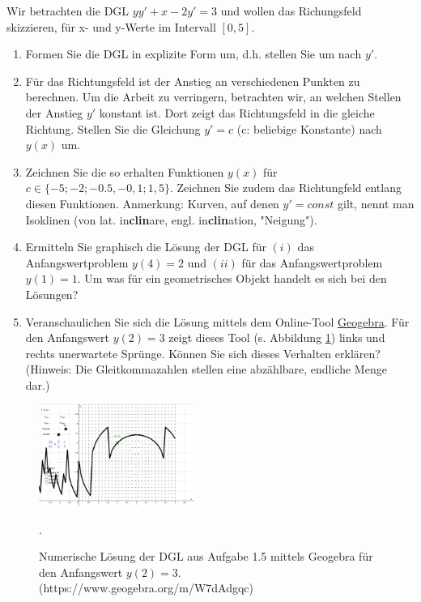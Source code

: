 \item Wir betrachten die DGL $yy'+x-2y'=3$ und wollen das Richungsfeld skizzieren, für x- und y-Werte im Intervall $[0,5]$.
\begin{enumerate}
\item Formen Sie die DGL in explizite Form um, d.h. stellen Sie um nach $y'$.
\item Für das Richtungsfeld ist der Anstieg an verschiedenen Punkten zu berechnen. Um die Arbeit zu verringern, betrachten wir, an welchen Stellen der Anstieg $y'$ konstant ist. Dort zeigt das Richtungsfeld in die gleiche Richtung. Stellen Sie die Gleichung $y'=c$ (c: beliebige Konstante) nach $y(x)$ um.
\item Zeichnen Sie die so erhalten Funktionen $y(x)$ für $c\in\lbrace-5;-2;-0.5,-0,1;1,5\rbrace$. Zeichnen Sie zudem das Richtungfeld entlang diesen Funktionen. Anmerkung: Kurven, auf denen $y'=const$ gilt, nennt man Isoklinen (von lat. in\textbf{clin}are, engl. in\textbf{clin}ation, "Neigung").
\item Ermitteln Sie graphisch die Lösung der DGL für $(i)$ das Anfangswertproblem $y(4)=2$ und $(ii)$ für das Anfangswertproblem $y(1) = 1$. Um was für ein geometrisches Objekt handelt es sich bei den Lösungen?
\item Veranschaulichen Sie sich die Lösung mittels dem Online-Tool \href{https://www.geogebra.org/m/W7dAdgqc}{Geogebra}. Für den Anfangswert $y(2)=3$ zeigt dieses Tool (s. Abbildung \ref{ex-ode-slope-field-1-img-a}) links und rechts unerwartete Sprünge. Können Sie sich dieses Verhalten erklären? (Hinweis: Die Gleitkommazahlen stellen eine abzählbare, endliche Menge dar.)
\end{enumerate}


\begin{figure}[ht]
	\centering
	\includegraphics[width=0.45\textwidth]{../pool/ex-ode-slope-field-1-img-a.png}
	\caption{Numerische Lösung der DGL aus Aufgabe 1.5 mittels Geogebra für den Anfangswert $y(2)=3$. (https://www.geogebra.org/m/W7dAdgqc)}.
	\label{ex-ode-slope-field-1-img-a}
\end{figure}

